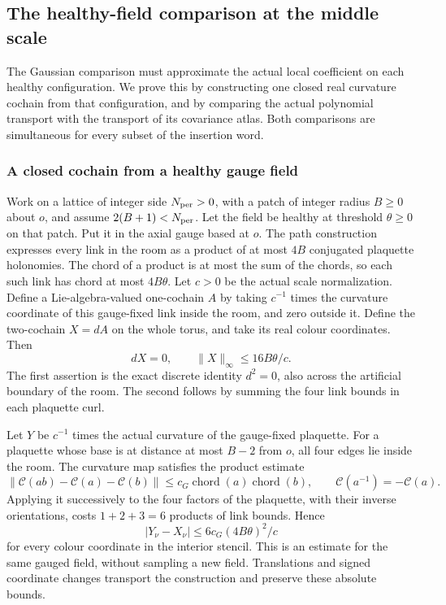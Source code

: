 \subsection{The healthy-field comparison at the middle scale}
\label{sec:marked-healthy-cumulant-launch}

The Gaussian comparison must approximate the actual local coefficient
on each healthy configuration. We prove this by constructing one closed
real curvature cochain from that configuration, and by comparing the
actual polynomial transport with the transport of its covariance atlas.
Both comparisons are simultaneous for every subset of the insertion word.

\subsubsection{A closed cochain from a healthy gauge field}

Work on a lattice of integer side $N_{\rm per}>0$, with a patch
of integer radius $B\ge0$ about $o$, and assume $2(B+1)<N_{\rm per}$.
Let the field be healthy at threshold
$\theta\ge0$ on that patch. Put it in the axial gauge based at $o$.
The path construction expresses every link in the room as a product
of at most $4B$ conjugated plaquette holonomies. The chord of a
product is at most the sum of the chords, so each such link has chord
at most $4B\theta$. Let $c>0$ be the actual scale normalization.
Define a Lie-algebra-valued one-cochain $A$ by taking $c^{-1}$
times the curvature coordinate of this gauge-fixed link inside the
room, and zero outside it. Define the two-cochain $X=dA$ on the
whole torus, and take its real colour coordinates. Then
\begin{equation}\label{eq:healthy-closed-cochain}
           dX=0,\qquad \|X\|_\infty\le16B\theta/c.
\end{equation}
The first assertion is the exact discrete identity $d^2=0$, also
across the artificial boundary of the room. The second follows by
summing the four link bounds in each plaquette curl.

Let $Y$ be $c^{-1}$ times the actual curvature of the gauge-fixed
plaquette. For a plaquette whose base is at distance at most $B-2$
from $o$, all four edges lie inside the room. The curvature map
satisfies the product estimate
\[
 \|\mathcal C(ab)-\mathcal C(a)-\mathcal C(b)\|
       \le c_G\operatorname{chord}(a)\operatorname{chord}(b),
 \qquad \mathcal C(a^{-1})=-\mathcal C(a).
\]
Applying it successively to the four factors of the plaquette,
with their inverse orientations, costs $1+2+3=6$ products of
link bounds. Hence
\begin{equation}\label{eq:healthy-curvature-linear-error}
     |Y_\nu-X_\nu|\le6c_G(4B\theta)^2/c
\end{equation}
for every colour coordinate in the interior stencil. This is an
estimate for the same gauged field, without sampling a new field.
Translations and signed coordinate changes transport the construction
and preserve these absolute bounds.

